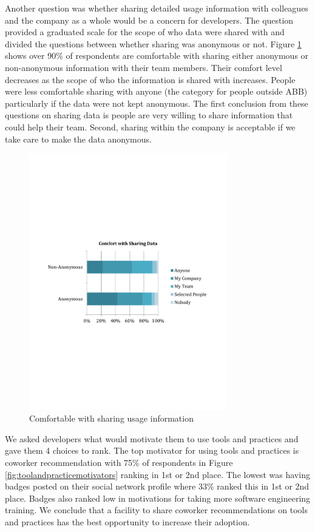 \documentclass{sig-alternate}
\begin{document}
Another question was whether sharing detailed usage information with colleagues and the company as a whole would be a concern for developers.  The question provided a graduated scale for the scope of who data were shared with and divided the questions between whether sharing was anonymous or not. Figure \ref{fig:comfortwithsharing}  shows over 90\% of respondents are comfortable with sharing either anonymous or non-anonymous information with their team members. 
Their comfort level decreases as the scope of who the information is shared with increases.  People were less comfortable sharing with anyone (the category for people outside ABB) particularly if the data were not kept anonymous.  
The first conclusion from these questions on sharing data is people are very willing to share information that could help their team. Second, sharing within the company is acceptable if we take care to make the data anonymous.

\begin{figure}
	\includegraphics[width=3.4in]{ComfortWithSharing.pdf}
	\caption{Comfortable with sharing usage information}
	\label{fig:comfortwithsharing}
\end{figure}

We asked developers what would motivate them to use tools and practices and gave them 4 choices to rank.  The top motivator for using tools and practices is coworker recommendation with 75\% of respondents in Figure \ref{fig:toolandpracticemotivators}   ranking in 1st or 2nd place. The lowest was having badges posted on their social network profile where 33\% ranked this in 1st or 2nd place.   Badges also ranked low in motivations for taking more software engineering training.  We conclude that a facility to share coworker recommendations on tools and practices has the best opportunity to increase their adoption.  
 
\end{document}
